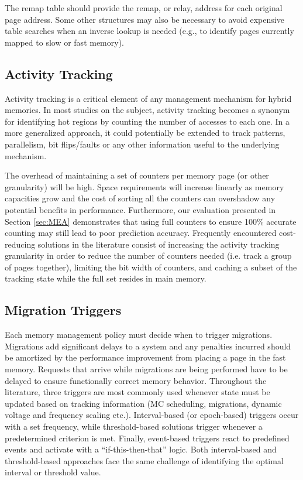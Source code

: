 The remap table should provide the remap, or relay, address for each original
page address.  Some other structures may also be necessary to avoid expensive
table searches when an inverse lookup is needed (e.g., to identify pages
currently mapped to slow or fast memory).

\subsection{Activity Tracking}
\label{sec:tracking}

Activity tracking is a critical element of any management mechanism for hybrid memories. In most studies on the subject, activity tracking becomes a synonym for identifying hot regions by counting the number of accesses to each one. In a more generalized approach, it could potentially be extended to track patterns, parallelism, bit flips/faults or any other information useful to the underlying mechanism.

The overhead of maintaining a set of counters per memory page (or other granularity) will be high. Space requirements will increase linearly as memory capacities grow and the cost of sorting all the counters can overshadow any potential benefits in performance. Furthermore, our evaluation presented in Section \ref{sec:MEA} demonstrates that using full counters to ensure 100\% accurate counting may still lead to poor prediction accuracy. Frequently encountered cost-reducing solutions in the literature consist of increasing the activity tracking granularity in order to reduce the number of counters needed (i.e. track a group of pages together), limiting the bit width of counters, and caching a subset of the tracking state while the full set resides in main memory. 


\subsection{Migration Triggers}

Each memory management policy must decide when to trigger migrations. 
Migrations add significant delays to a system and any penalties incurred should be amortized by the performance improvement from placing a page in the fast memory. Requests that arrive while migrations are being performed have to be delayed to ensure functionally correct memory behavior. Throughout the literature, three triggers are most commonly used whenever state must be updated based on tracking information (MC scheduling, migrations, dynamic voltage and frequency scaling etc.). Interval-based (or epoch-based) triggers occur with a set frequency, while threshold-based solutions trigger whenever a predetermined criterion is met. Finally, event-based triggers react to predefined events and activate with a ``if-this-then-that'' logic. 
Both interval-based and threshold-based approaches face the same challenge of identifying the optimal interval or threshold value. 

